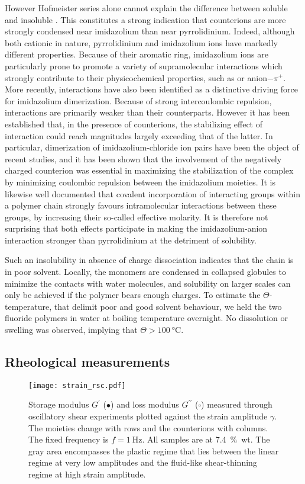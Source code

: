 \documentclass[twoside,twocolumn,9pt]{article}
\begin{document}
However Hofmeister series alone cannot explain the difference between soluble  and insoluble . This constitutes a strong indication that counterions are more strongly condensed near imidazolium than near pyrrolidinium. Indeed, although both cationic in nature, pyrrolidinium and imidazolium ions have markedly different properties. Because of their aromatic ring, imidazolium ions are particularly prone to promote a variety of supramolecular interactions which strongly contribute to their physicochemical properties, such as \ce{\pi+-\pi} or anion$-\pi^+$.  More recently, \ce{\pi+-\pi+} interactions have also been identified as a distinctive driving force for imidazolium dimerization\cite{Geronimo2011}. Because of strong intercoulombic repulsion, \ce{\pi+-\pi+} interactions are primarily weaker than their \ce{\pi-\pi} counterparts. However it has been established that, in the presence of counterions, the stabilizing effect of \ce{\pi+-\pi+} interaction could reach magnitudes largely exceeding that of the latter\cite{Geronimo2011}. In particular, dimerization of imidazolium-chloride ion pairs have been the object of recent studies, and it has been shown that the involvement of the negatively charged counterion was essential in maximizing the stabilization of the \ce{\pi+-\pi+} complex by minimizing coulombic repulsion between the imidazolium moieties\cite{Matthews2014,Gao2015a}. It is likewise well documented that covalent incorporation of interacting groups within a polymer chain strongly favours intramolecular interactions between these groups, by increasing their so-called effective molarity\cite{Li2003,Mulder2004,Huerta2013}. It is therefore not surprising that both effects participate in making the imidazolium-anion interaction stronger than pyrrolidinium at the detriment of solubility.

Such an insolubility in absence of charge dissociation indicates that the chain is in poor solvent. Locally, the monomers are condensed in collapsed globules to minimize the contacts with water molecules, and solubility on larger scales can only be achieved if the polymer bears enough charges\cite{Khokhlov1980,Raphael1990}. To estimate the $\Theta$-temperature, that delimit poor and good solvent behaviour, we held the two fluoride polymers in water at boiling temperature overnight. No dissolution or swelling was observed, implying that $\Theta>\SI{100}{\celsius}$.

\subsection{Rheological measurements}
\begin{figure*}
\texttt{[image: strain\_rsc.pdf]}%
\caption{Storage modulus $G^\prime$ ($\bullet$) and loss modulus $G^{\prime\prime}$ ($\square$) measured through oscillatory shear experiments plotted against the strain amplitude $\gamma$. The moieties change with rows and the counterions with columns. The fixed frequency is $f=\SI{1}{\hertz}$. All samples are at 7.4~\%~wt. The gray area encompasses the plastic regime that lies between the linear regime at very low amplitudes and the fluid-like shear-thinning regime at high strain amplitude.}%
\label{fig:strain}%
\end{figure*}
\end{document}
